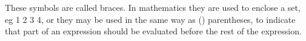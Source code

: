 These symbols {} are called braces. In mathematics they
are used to enclose a set, eg {1 2 3 4}, or they may be used
in the same way as () parentheses, to indicate that part of
an expression should be evaluated before the rest of the
expression.
